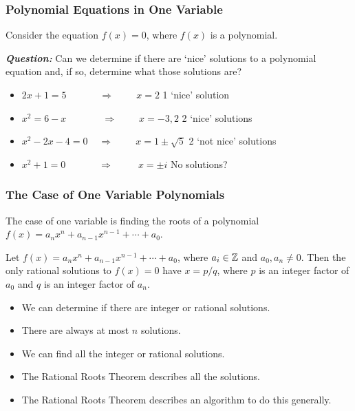 \begin{frame}[plain] \frametitle{Polynomial Equations in One Variable}
\small Consider the equation $f(x)= 0$, where $f(x)$ is a polynomial. \par\vspace{0.3cm}

{\itshape \bfseries Question:} Can we determine if there are `nice' solutions to a polynomial equation and, if so, determine what those solutions are? \par\vspace{0.3cm}

\begin{ex}
	\begin{itemize}
	\item $2x + 1= 5 \phantom{xxx..xx} \Longrightarrow \phantom{xxxx} x= 2$ \hfill 1 `nice' solution
	\item $x^2= 6 - x \phantom{xxx.xxx} \Longrightarrow \phantom{xxxx} x= -3, 2$ \hfill 2 `nice' solutions
	\item $x^2 - 2x - 4 = 0 \phantom{xx} \Longrightarrow \phantom{xxxx} x= 1 \pm \sqrt{5}$ \hfill 2 `not nice' solutions
	\item $x^2 + 1= 0 \phantom{xxx..xx} \Longrightarrow \phantom{xxxx.} x= \pm i$ \hfill No solutions?
	\end{itemize}
\end{ex} \par\vspace{0.3cm}
\end{frame}



\begin{frame}[plain] \frametitle{The Case of One Variable Polynomials}
The case of one variable is finding the roots of a polynomial $f(x)= a_n x^n + a_{n-1} x^{n-1} + \cdots + a_0$.

\begin{thm}
Let $f(x)= a_n x^n + a_{n-1} x^{n-1} + \cdots + a_0$, where $a_i \in \mathbb{Z}$ and $a_0,a_n \neq 0$. Then the only rational solutions to $f(x)=0$ have $x= p/q$, where $p$ is an integer factor of $a_0$ and $q$ is an integer factor of $a_n$. 
\end{thm}

\begin{itemize}
\item We can determine if there are integer or rational solutions.
\item There are always at most $n$ solutions.
\item We can find all the integer or rational solutions.
\item The Rational Roots Theorem describes all the solutions.
\item The Rational Roots Theorem describes an algorithm to do this generally. 
\end{itemize}
\end{frame}




